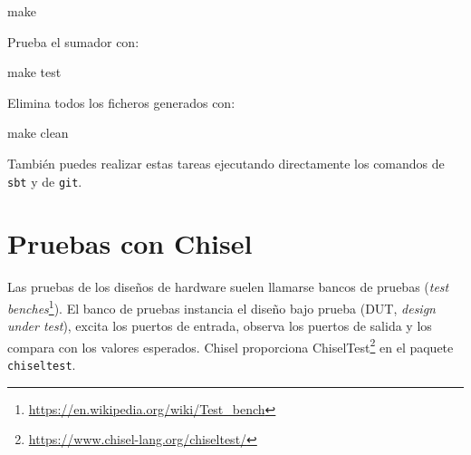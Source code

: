 \documentclass[%
    10pt,
    headinclude, footinclude=false,
    openright, %
    notitlepage,
    cleardoublepage=empty,
    headsepline,
    numbers=noenddot,
    bibliography=totoc, index=totoc,
    ]{scrbook}
\newcommand{\code}[1]{{\lstinline[basicstyle=\small\ttfamily]{#1}}}
\newcommand{\myref}[2]{\href{#1}{#2}}
\renewcommand{\myref}[2]{{#2}{\footnote{\url{#1}}}}
\begin{document}
\begin{chisel}
make
\end{chisel}


\noindent Prueba el sumador con:

\begin{chisel}
make test
\end{chisel}


\noindent Elimina todos los ficheros generados con:

\begin{chisel}
make clean
\end{chisel}


\noindent También puedes realizar estas tareas ejecutando directamente los comandos de \code{sbt} y de
\code{git}.

\section{Pruebas con Chisel}


Las pruebas de los diseños de hardware suelen llamarse bancos de pruebas
(\myref{https://en.wikipedia.org/wiki/Test_bench}{\emph{test benches}}).
El banco de pruebas instancia el diseño bajo prueba (DUT, \emph{design under test}), excita los puertos de
entrada, observa los puertos de salida y los compara con los valores esperados.
Chisel proporciona \myref{https://www.chisel-lang.org/chiseltest/}{ChiselTest}
en el paquete \code{chiseltest}.

\end{document}
